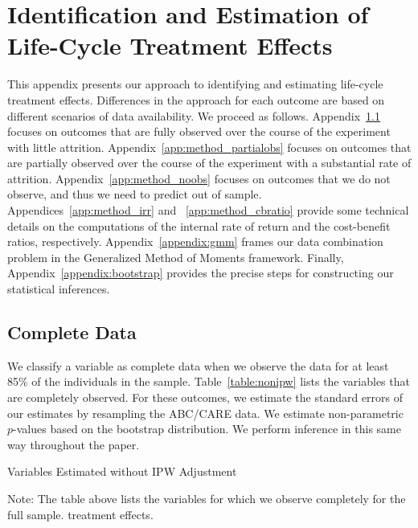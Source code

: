 \section{Identification and Estimation of Life-Cycle Treatment Effects} \label{appendix:methodology}

This appendix presents our approach to identifying and estimating life-cycle treatment effects. Differences in the approach for each outcome are based on different scenarios of data availability. We proceed as follows. Appendix~\ref{app:method_fullobs} focuses on outcomes that are fully observed over the course of the experiment with little attrition. Appendix~\ref{app:method_partialobs} focuses on outcomes that are partially observed over the course of the experiment with a substantial rate of attrition. Appendix~\ref{app:method_noobs}  focuses on outcomes that we do not observe, and thus we need to predict out of sample. Appendices~\ref{app:method_irr} and ~\ref{app:method_cbratio} provide some technical details on the computations of the internal rate of return and the cost-benefit ratios, respectively. Appendix~\ref{appendix:gmm} frames our data combination problem in the Generalized Method of Moments framework. Finally, Appendix~\ref{appendix:bootstrap} provides the precise steps for constructing our statistical inferences.

\subsection{Complete Data}\label{app:method_fullobs}

We classify a variable as complete data when we observe the data for at least 85\% of the individuals in the sample. Table~\ref{table:nonipw} lists the variables that are completely observed. For these outcomes, we estimate the standard errors of our estimates by resampling the ABC/CARE data. We estimate non-parametric $p$-values based on the bootstrap distribution. We perform inference in this same way throughout the paper.

\begin{table}[H]
\begin{threeparttable}
\caption{Variables Estimated without IPW Adjustment}
\label{table:nonipw}
\centering

\begin{tablenotes}
\footnotesize
\item Note: The table above lists the variables for which we observe completely for the full sample.
treatment effects.
\end{tablenotes}
\end{threeparttable}
\end{table}

